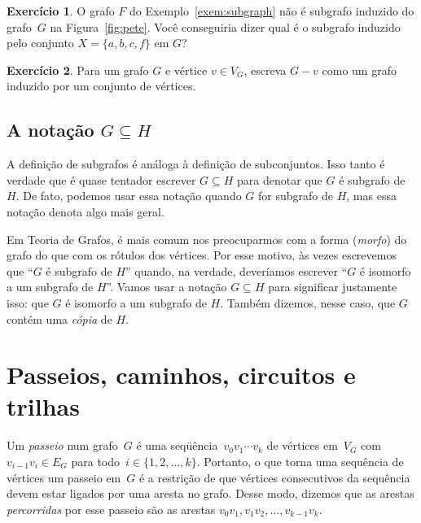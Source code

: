 \documentclass[12pt, a4paper]{article}
\theoremstyle{definition}
\newtheorem{exer}{Exercício}
\begin{document}
\begin{exer}
O grafo $F$ do Exemplo~\ref{exem:subgraph} não é subgrafo induzido do grafo~$G$ na Figura~\ref{fig:pete}. Você conseguiria dizer qual é o subgrafo induzido pelo conjunto  $X = \{a,b,c,f\}$ em $G$? 
\end{exer}

\begin{exer}
Para um grafo $G$ e vértice $v \in V_G$, escreva $G - v$ como um grafo induzido por um conjunto de vértices.
\end{exer}


\subsection{A notação $G \subseteq H$}

A definição de subgrafos é análoga à definição de subconjuntos. Isso tanto é verdade que é quase tentador escrever $G \subseteq H$ para denotar que $G$ é subgrafo de $H$. De fato, podemos usar essa notação quando $G$ for subgrafo de $H$, mas essa notação denota algo mais geral.

Em Teoria de Grafos, é mais comum nos preocuparmos com a forma (\emph{morfo}) do grafo do que com os rótulos dos vértices. Por esse motivo, às vezes escrevemos que ``$G$ é subgrafo de $H$'' quando, na verdade, deveríamos escrever ``$G$ é isomorfo a um subgrafo de $H$''. Vamos usar a notação $G \subseteq H$ para significar justamente isso: que $G$ é isomorfo a um subgrafo de $H$. Também dizemos, nesse caso, que $G$ contém uma \emph{cópia} de $H$.

\section{Passeios, caminhos, circuitos e trilhas}

Um \emph{passeio} num grafo~$G$ é uma seqüência~$v_0 v_1
\cdots v_k$ de vértices em~$V_G$ com~$v_{i-1} v_i \in E_G$ para todo~$i \in \{1,2,\dots,k\}$. Portanto, o que torna uma sequência de vértices um passeio em~$G$ é a restrição de que vértices consecutivos da sequência devem estar ligados por uma aresta no grafo. Desse modo, dizemos que as arestas \emph{percorridas} por esse passeio são as arestas $v_0v_1, v_1v_2, \dots, v_{k-1}v_k$.  
\end{document}
